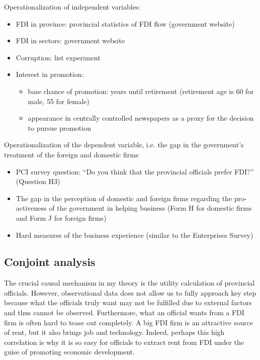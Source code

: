 Operationalization of independent variables:
\begin{itemize}
\item FDI in province: provincial statistics of FDI flow (government website)
\item FDI in sectors: government website
\item Corruption: list experiment \citep{Malesky2015}
\item Interest in promotion: 
\begin{itemize}
	\item base chance of promotion: years until retirement (retirement age is 60 for male, 55 for female)
	\item appearance in centrally controlled newspapers as a proxy for the decision to pursue promotion
\end{itemize}
\end{itemize}

Operationalization of the dependent variable, i.e. the gap in the government's treatment of the foreign and domestic firms
\begin{itemize}
	\item PCI survey question: ``Do you think that the provincial officials prefer FDI?'' (Question H3)
	\item The gap in the perception of domestic and foreign firms regarding the pro-activeness of the government in helping business (Form H for domestic firms and Form J for foreign firms)
	\item Hard measures of the business experience (similar to the Enterprises Survey)
\end{itemize}

\subsection{Conjoint analysis}

The crucial causal mechanism in my theory is the utility calculation of provincial officials. However, observational data does not allow us to fully approach key step because what the officials truly want may not be fulfilled due to external factors and thus cannot be observed. Furthermore, what an official wants from a FDI firm is often hard to tease out completely. A big FDI firm is an attractive source of rent, but it also brings job and technology. Indeed, perhaps this high correlation is why it is so easy for officials to extract rent from FDI under the guise of promoting economic development.

